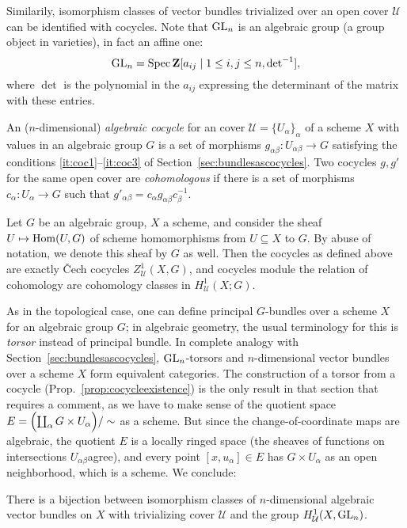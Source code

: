 \documentclass[a4paper,openany]{scrbook}
\begin{document}
Similarily, isomorphism classes of vector bundles trivialized over an open cover $\mathcal U$ can be identified with cocycles. Note that $\operatorname{GL}_n$ is an algebraic group (a group object in varieties), in fact an affine one:
\[
\operatorname{GL}_n = \operatorname{Spec} \mathbf Z[a_{ij} \mid 1 \leq i,j \leq n, \det\nolimits^{-1}],
\]
where $\det$ is the polynomial in the $a_{ij}$ expressing the determinant of the matrix with these entries.

\begin{defn}
An ($n$-dimensional) \emph{algebraic cocycle} for an cover $\mathcal U=\{U_\alpha\}_\alpha$ of a scheme $X$ with values in an algebraic group $G$ is a set of morphisms $g_{\alpha\beta}\colon U_{\alpha\beta} \to G$ satisfying the conditions \ref{it:coc1}--\ref{it:coc3} of Section~\ref{sec:bundlesascocycles}. Two cocycles $g,g'$ for the same open cover are \emph{cohomologous} if there is a set of morphisms $c_\alpha\colon U_\alpha \to G$ such that $g'_{\alpha\beta}=c_\alpha g_{\alpha\beta}c_{\beta}^{-1}$.
\end{defn}

\begin{remark}
Let $G$ be an algebraic group, $X$ a scheme, and consider the sheaf $U \mapsto \operatorname{Hom}(U,G)$ of scheme homomorphisms from $U \subseteq X$ to $G$. By abuse of notation, we denote this sheaf by $G$ as well.
Then the cocycles as defined above are exactly \v Cech cocycles $Z^1_{\mathcal U}(X,G)$, and cocycles module the relation of cohomology are cohomology classes in $H_{\mathcal U}^1(X;G)$.
\end{remark}

As in the topological case, one can define principal $G$-bundles over a scheme $X$ for an algebraic group $G$; in algebraic geometry, the usual terminology for this is \emph{torsor} instead of principal bundle. In complete analogy with Section~\ref{sec:bundlesascocycles}, $\operatorname{GL}_n$-torsors and $n$-dimensional vector bundles over a scheme $X$ form equivalent categories. The construction of a torsor from a cocycle (Prop.~\ref{prop:cocycleexistence}) is the only result in that section that requires a comment, as we have to make sense of the quotient space $E=\Bigl(\coprod_\alpha G \times U_\alpha\Bigr)/\sim$ as a scheme. But since the change-of-coordinate maps are algebraic, the quotient $E$ is a locally ringed space (the sheaves of functions on intersections $U_{\alpha\beta}$agree), and every point $[x,u_\alpha] \in E$ has $G \times U_\alpha$ as an open neighborhood, which is a scheme. We conclude:

\begin{corollary}
There is a bijection between isomorphism classes of $n$-dimensional algebraic vector bundles on $X$ with trivializing cover $\mathcal U$ and the group $H^1_{\mathcal U}(X,\operatorname{GL}_n)$.
\end{corollary}
\end{document}
